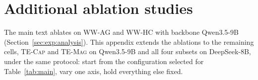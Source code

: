 
\section{Additional ablation studies}
\label{app:deepseek-ablations}

The main text ablates \soap{} on \textsc{WW-AG} and \textsc{WW-HC} with backbone Qwen3.5-9B (Section~\ref{sec:exp:analysis}). This appendix extends the ablations to the
remaining cells, \textsc{TE-Cap} and \textsc{TE-Mag} on Qwen3.5-9B and all four subsets on
DeepSeek-8B, under the same protocol: start from the configuration
selected for Table~\ref{tab:main}, vary one axis, hold everything else fixed.

